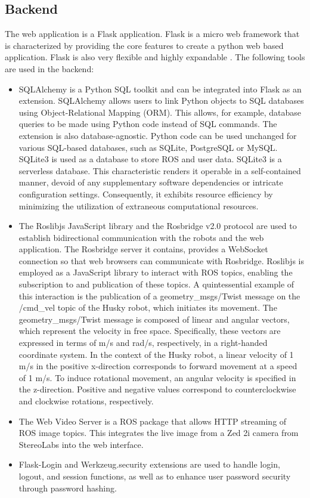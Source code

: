 \documentclass[conference]{IEEEtran}
\begin{document}
\subsection{Backend}
The web application is a Flask application. Flask is a micro web framework that is characterized by providing the core features to create a python web based application. 
Flask is also very flexible and highly expandable \cite{flasksqlite}. The following tools are used in the backend:
\begin{itemize}
\item SQLAlchemy is a Python SQL toolkit and can be integrated into Flask as an extension. SQLAlchemy allows users to link Python objects to SQL databases using Object-Relational Mapping (ORM). This allows, for example, database queries to be made using Python code instead of SQL commands. The extension is also database-agnostic. 
Python code can be used unchanged for various SQL-based databases, such as SQLite, PostgreSQL or MySQL. 
SQLite3 is used as a database to store ROS and user data. SQLite3 is a serverless database. This characteristic renders it operable in a self-contained manner, devoid of any supplementary software dependencies or intricate configuration settings. Consequently, it exhibits resource efficiency by minimizing the utilization of extraneous computational resources.
\item The Roslibjs JavaScript library and the Rosbridge v2.0 protocol are used to establish bidirectional communication with the robots and the web application. The Rosbridge server it contains, provides a WebSocket connection so that web browsers can communicate with Rosbridge.
Roslibjs is employed as a JavaScript library to interact with ROS topics, enabling the subscription to and publication of these topics. A quintessential example of this interaction is the publication of a geometry\_msgs/Twist message on the /cmd\_vel topic of the Husky robot, which initiates its movement.
The geometry\_msgs/Twist message is composed of linear and angular vectors, which represent the velocity in free space. Specifically, these vectors are expressed in terms of m/s and rad/s, respectively, in a right-handed coordinate system.
In the context of the Husky robot, a linear velocity of 1 m/s in the positive x-direction corresponds to forward movement at a speed of 1 m/s. To induce rotational movement, an angular velocity is specified in the z-direction. Positive and negative values correspond to counterclockwise and clockwise rotations, respectively.
\item The Web Video Server is a ROS package that allows HTTP streaming of ROS image topics. This integrates the live image from a Zed 2i camera from StereoLabs into the web interface.
\item Flask-Login and Werkzeug.security extensions are used to handle login, logout, and session functions, as well as to enhance user password security through password hashing.
\end{itemize}
\end{document}

